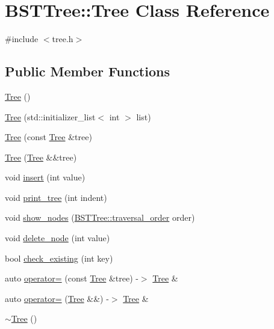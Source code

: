 \hypertarget{class_b_s_t_tree_1_1_tree}{}\section{B\+S\+T\+Tree\+:\+:Tree Class Reference}
\label{class_b_s_t_tree_1_1_tree}


{\ttfamily \#include $<$tree.\+h$>$}

\subsection*{Public Member Functions}
\begin{DoxyCompactItemize}
\item 
\mbox{\hyperlink{class_b_s_t_tree_1_1_tree_ab341ae8f5ea3eec3dd7eb2acb0126e8b}{Tree}} ()
\item 
\mbox{\hyperlink{class_b_s_t_tree_1_1_tree_a425b43fb9301c18ac7241e173b05f7e0}{Tree}} (std\+::initializer\+\_\+list$<$ int $>$ list)
\item 
\mbox{\hyperlink{class_b_s_t_tree_1_1_tree_aa16db87e1a4e57addbbd8513f20150a5}{Tree}} (const \mbox{\hyperlink{class_b_s_t_tree_1_1_tree}{Tree}} \&tree)
\item 
\mbox{\hyperlink{class_b_s_t_tree_1_1_tree_a1177427abc9e4e1c77358c30b5eaeda2}{Tree}} (\mbox{\hyperlink{class_b_s_t_tree_1_1_tree}{Tree}} \&\&tree)
\item 
void \mbox{\hyperlink{class_b_s_t_tree_1_1_tree_a4f6816912547a485ab853eb125e261a2}{insert}} (int value)
\item 
void \mbox{\hyperlink{class_b_s_t_tree_1_1_tree_aaa4094ca75c834acc9dbd1201791450e}{print\+\_\+tree}} (int indent)
\item 
void \mbox{\hyperlink{class_b_s_t_tree_1_1_tree_a122d418f295da0b66ae050174e74a828}{show\+\_\+nodes}} (\mbox{\hyperlink{namespace_b_s_t_tree_a711723b85e5af09e10bfcc3a3b501fe2}{B\+S\+T\+Tree\+::traversal\+\_\+order}} order)
\item 
void \mbox{\hyperlink{class_b_s_t_tree_1_1_tree_ae1b302d3de2ca202f7b89bd46d4a7eca}{delete\+\_\+node}} (int value)
\item 
bool \mbox{\hyperlink{class_b_s_t_tree_1_1_tree_ac78c4c85e486aade23d8ac740a711537}{check\+\_\+existing}} (int key)
\item 
auto \mbox{\hyperlink{class_b_s_t_tree_1_1_tree_a4310f8ce5de32401811946bb20b5e634}{operator=}} (const \mbox{\hyperlink{class_b_s_t_tree_1_1_tree}{Tree}} \&tree) -\/$>$ \mbox{\hyperlink{class_b_s_t_tree_1_1_tree}{Tree}} \&
\item 
auto \mbox{\hyperlink{class_b_s_t_tree_1_1_tree_aa71187977d9e86293e250214bb53f423}{operator=}} (\mbox{\hyperlink{class_b_s_t_tree_1_1_tree}{Tree}} \&\&) -\/$>$ \mbox{\hyperlink{class_b_s_t_tree_1_1_tree}{Tree}} \&
\item 
\mbox{\hyperlink{class_b_s_t_tree_1_1_tree_a9342fe23d2476501afc8574ba822d0dd}{$\sim$\+Tree}} ()
\end{DoxyCompactItemize}
